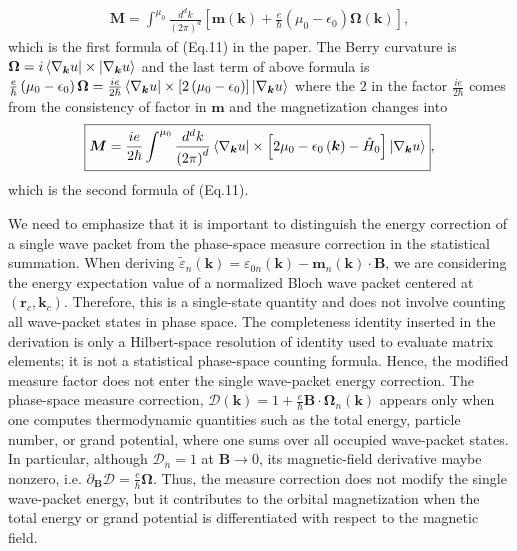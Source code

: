 \documentclass[12pt, oneside]{article}
\newcommand{\pa}{\partial}
\newcommand{\p}[1]{\left(#1\right)}
\newcommand{\bb}[1]{\left[#1\right]}
\numberwithin{equation}{subsection}
\begin{document}
\begin{align}
	\boxed{\bm{M} = \int^{\mu_0} \frac{d^d k}{\p{2 \pi}^{d}} \bb{\bm{m} \p{\bm{k}} + \frac{e}{\hbar}  \p{\mu_0 - \epsilon_0 } \bm{\Omega} \p{\bm{k}}}},
\end{align}
which is the first formula of (Eq.11) in the paper. The Berry curvature is \(\bm{\Omega} = i \braket{\nabla_{\bm{k}} u | \times | \nabla_{\bm{k}} u } \) and the last term of above formula is \(\frac{e}{\hbar}  \p{\mu_0 - \epsilon_0 } \bm{\Omega} = \frac{i e }{2 \hbar}  \braket{\nabla_{\bm{k}} u | \times \bb{2  \p{\mu_0 - \epsilon_0} }   | \nabla_{\bm{k}} u }  \) where the \(2\) in the factor \(\frac{i e }{2 \hbar}\) comes from the consistency of factor in \(\bm{m}\) and the magnetization changes into 
\begin{align}
	\boxed{\bm{M} = \frac{i e}{2 \hbar}\int^{\mu_0} \frac{d^d k}{\p{2 \pi}^{d}} \braket{\nabla_{\bm{k}} u | \times \bb{2 \mu_0 - \epsilon_0 \p{\bm{k}} - \hat{H}_0}| \nabla_{\bm{k}} u}},
\end{align}
which is the second formula of (Eq.11).

We need to emphasize that it is important to distinguish the energy correction of a single wave packet from the phase-space measure correction in the statistical summation. When deriving \(\tilde{\varepsilon}_n(\bm{k})=\varepsilon_{0n}(\bm{k})-\bm{m}_n \p{\bm{k}} \cdot \bm{B}\), we are considering the energy expectation value of a normalized Bloch wave packet centered at \((\bm{r}_c,\bm{k}_c)\). Therefore, this is a single-state quantity and does not involve counting all wave-packet states in phase space. The completeness identity inserted in the derivation is only a Hilbert-space resolution of identity used to evaluate matrix elements; it is not a statistical phase-space counting formula. Hence, the modified measure factor does not enter the single wave-packet energy correction. The phase-space measure correction, \(\mathcal{D} \p{\bm{k}}=1+\frac{e}{\hbar} \bm{B} \cdot \bm\Omega_n \p{\bm{k}} \) appears only when one computes thermodynamic quantities such as the total energy, particle number, or grand potential, where one sums over all occupied wave-packet states. In particular, although \(\mathcal{D}_n=1\) at \(\bm{B}\to0\), its magnetic-field derivative maybe nonzero, i.e. \(\pa_{\bm{B}} \mathcal{D} = \frac{e}{\hbar} \bm{\Omega}\). Thus, the measure correction does not modify the single wave-packet energy, but it contributes to the orbital magnetization when the total energy or grand potential is differentiated with respect to the magnetic field.
\end{document}
